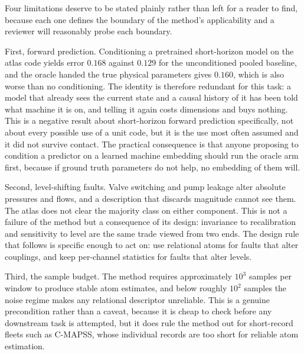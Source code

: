 \documentclass[11pt]{article}
\begin{document}
Four limitations deserve to be stated plainly rather than left for a reader to
find, because each one defines the boundary of the method's applicability and
a reviewer will reasonably probe each boundary.

First, forward prediction. Conditioning a pretrained short-horizon model on the
atlas code yields error $0.168$ against $0.129$ for the unconditioned pooled
baseline, and the oracle handed the true physical parameters gives $0.160$,
which is also worse than no conditioning. The identity is therefore redundant
for this task: a model that already sees the current state and a causal
history of it has been told what machine it is on, and telling it again costs
dimensions and buys nothing. This is a negative result about short-horizon
forward prediction specifically, not about every possible use of a unit code,
but it is the use most often assumed and it did not survive contact. The
practical consequence is that anyone proposing to condition a predictor on a
learned machine embedding should run the oracle arm first, because if ground
truth parameters do not help, no embedding of them will.

Second, level-shifting faults. Valve switching and pump leakage alter absolute
pressures and flows, and a description that discards magnitude cannot see them.
The atlas does not clear the majority class on either component. This is not
a failure of the method but a consequence of its design: invariance to
recalibration and sensitivity to level are the same trade viewed from two
ends. The design rule that follows is specific enough to act on: use
relational atoms for faults that alter couplings, and keep per-channel
statistics for faults that alter levels.

Third, the sample budget. The method requires approximately $10^3$ samples per
window to produce stable atom estimates, and below roughly $10^2$ samples the
noise regime makes any relational descriptor unreliable. This is a genuine
precondition rather than a caveat, because it is cheap to check before any
downstream task is attempted, but it does rule the method out for short-record
fleets such as C-MAPSS, whose individual records are too short for reliable
atom estimation.
\end{document}

